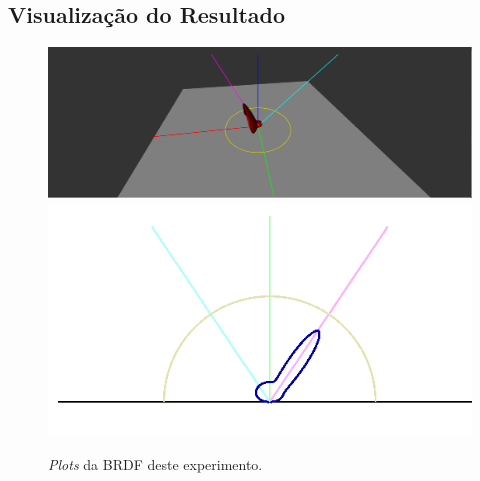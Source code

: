 \subsection{Visualização do Resultado}

\begin{figure}[H]
    \caption{\small{\textit{Plots} da BRDF deste experimento.}}\label{fig-ashikhmin-shirley-close-to-original-plots}
    \vspace{42px}
  \includegraphics[width=\linewidth]{./Imagens/brdfs/ashikhmin-shirley-close-to-original-3D-plot}
\endminipage\hfill
{}
  \includegraphics[width=\linewidth]{./Imagens/brdfs/ashikhmin-shirley-close-to-original-polar-plot.png}
\endminipage\hfill
\end{figure}


